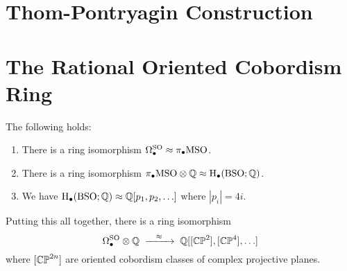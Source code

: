 \section{Thom-Pontryagin Construction}\label{sec:thom-pontryagin_construction}

\section{The Rational Oriented Cobordism Ring}

\begin{theorem}\label{thm:thom-pontryagin_oriented_cobordism}
  The following holds:
  \begin{enumerate}
    \item There is a ring isomorphism $\Omega^{\operatorname{SO}}_\bullet \approx \pi_\bullet {\operatorname{MSO}}$.
    \item There is a ring isomorphism $\pi_\bullet{\operatorname{MSO}} \otimes \mathbb{Q} \approx \operatorname{H}_\bullet({\operatorname{BSO}}; \mathbb{Q})$.
    \item We have $\operatorname{H}_\bullet({\operatorname{BSO}}; \mathbb{Q}) \approx \mathbb{Q}[p_1, p_2,\ldots]$ where $|p_i|=4i$.
  \end{enumerate}
  Putting this all together, there is a ring isomorphism
  \[
    \Omega^\SO_\bullet\otimes \Q \lkxto[\cong] \Q[[\CP^2], [\CP^4],\ldots]
  \]
  where $[\mathbb{CP}^{2n}]$ are oriented cobordism classes of complex projective planes.
\end{theorem}
